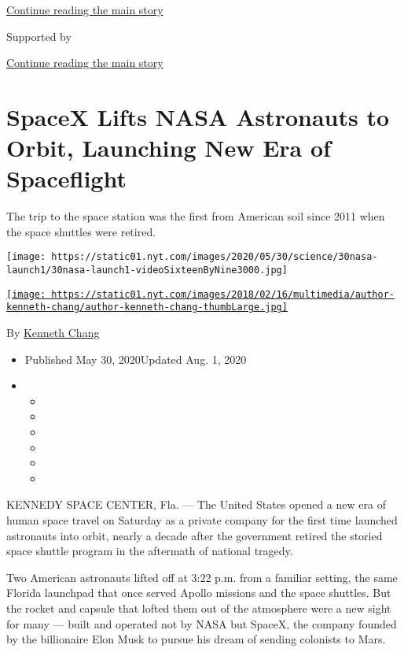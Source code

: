 \protect\hyperlink{after-top}{Continue reading the main story}

Supported by

\protect\hyperlink{after-sponsor}{Continue reading the main story}

\hypertarget{spacex-lifts-nasa-astronauts-to-orbit-launching-new-era-of-spaceflight}{%
\section{SpaceX Lifts NASA Astronauts to Orbit, Launching New Era of
Spaceflight}\label{spacex-lifts-nasa-astronauts-to-orbit-launching-new-era-of-spaceflight}}

The trip to the space station was the first from American soil since
2011 when the space shuttles were retired.

\texttt{[image: https://static01.nyt.com/images/2020/05/30/science/30nasa-launch1/30nasa-launch1-videoSixteenByNine3000.jpg]}

\href{https://www.nytimes.com/by/kenneth-chang}{\texttt{[image: https://static01.nyt.com/images/2018/02/16/multimedia/author-kenneth-chang/author-kenneth-chang-thumbLarge.jpg]}}

By \href{https://www.nytimes.com/by/kenneth-chang}{Kenneth Chang}

\begin{itemize}
\item
  Published May 30, 2020Updated Aug. 1, 2020
\item
  \begin{itemize}
  \item
  \item
  \item
  \item
  \item
  \item
  \end{itemize}
\end{itemize}

KENNEDY SPACE CENTER, Fla. --- The United States opened a new era of
human space travel on Saturday as a private company for the first time
launched astronauts into orbit, nearly a decade after the government
retired the storied space shuttle program in the aftermath of national
tragedy.

Two American astronauts lifted off at 3:22 p.m. from a familiar setting,
the same Florida launchpad that once served Apollo missions and the
space shuttles. But the rocket and capsule that lofted them out of the
atmosphere were a new sight for many --- built and operated not by NASA
but SpaceX, the company founded by the billionaire Elon Musk to pursue
his dream of sending colonists to Mars.


